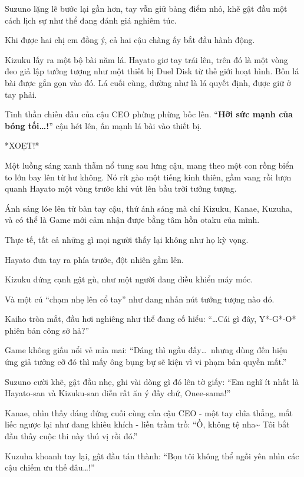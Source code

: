 \documentclass[../main.tex]{subfiles}
\begin{document}
Suzuno lặng lẽ bước lại gần hơn, tay vẫn giữ bảng điểm nhỏ, khẽ gật đầu một cách lịch sự như thể đang đánh giá nghiêm túc.

Khi được hai chị em đồng ý, cả hai cậu chàng ấy bắt đầu hành động.

Kizuku lấy ra một bộ bài năm lá. Hayato giơ tay trái lên, trên đó là một vòng đeo giả lập tưởng tượng như một thiết bị Duel Disk từ thế giới hoạt hình. Bốn lá bài được gắn gọn vào đó. Lá cuối cùng, dường như là lá quyết định, được giữ ở tay phải.

Tinh thần chiến đấu của cậu CEO phừng phừng bốc lên. ``\textbf{Hỡi sức mạnh của bóng tối\dots!}'' cậu hét lên, ấn mạnh lá bài vào thiết bị.

*XOẸT!*

Một luồng sáng xanh thẫm nổ tung sau lưng cậu, mang theo một con rồng biển to lớn bay lên từ hư không. Nó rít gào một tiếng kinh thiên, gầm vang rồi lượn quanh Hayato một vòng trước khi vút lên bầu trời tưởng tượng.

Ánh sáng lóe lên từ bàn tay cậu, thứ ánh sáng mà chỉ Kizuku, Kanae, Kuzuha, và có thể là Game mới cảm nhận được bằng tâm hồn otaku của mình.


Thực tế, tất cả những gì mọi người thấy lại không như họ kỳ vọng.

Hayato đưa tay ra phía trước, đột nhiên gầm lên.

Kizuku đứng cạnh gật gù, như một người đang điều khiển máy móc.

Và một cú ``chạm nhẹ lên cổ tay'' như đang nhấn nút tưởng tượng nào đó.

Kaiho tròn mắt, đầu hơi nghiêng như thể đang cố hiểu: ``\dots Cái gì đây, Y*-G*-O* phiên bản công sở hả?''

Game không giấu nổi vẻ mỉa mai: ``Dáng thì ngầu đấy\dots\ nhưng dùng đến hiệu ứng giả tưởng cỡ đó thì mấy ông bụng bự sẽ kiện vì vi phạm bản quyền mất.''

Suzuno cười khẽ, gật đầu nhẹ, ghi vài dòng gì đó lên tờ giấy: ``Em nghĩ ít nhất là Hayato-san và Kizuku-san diễn rất ăn ý đấy chứ, Onee-sama!''

Kanae, nhìn thấy dáng đứng cuối cùng của cậu CEO - một tay chĩa thẳng, mắt liếc ngược lại như đang khiêu khích - liền trầm trồ: ``Ồ, không tệ nha\~{} Tôi bắt đầu thấy cuộc thi này thú vị rồi đó.''

Kuzuha khoanh tay lại, gật đầu tán thành: ``Bọn tôi không thể ngồi yên nhìn các cậu chiếm ưu thế đâu\dots!''
\end{document}
